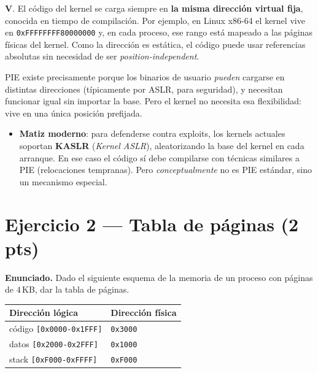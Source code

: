 \documentclass[11pt,a4paper]{article}
\begin{document}
\begin{respuesta}
\textbf{V}. El código del kernel se carga siempre en \textbf{la misma
dirección virtual fija}, conocida en tiempo de compilación. Por
ejemplo, en Linux x86-64 el kernel vive en
\texttt{0xFFFFFFFF80000000} y, en cada proceso, ese rango está
mapeado a las páginas físicas del kernel. Como la dirección es
estática, el código puede usar referencias absolutas sin necesidad
de ser \emph{position-independent}.

PIE existe precisamente porque los binarios de usuario \emph{pueden}
cargarse en distintas direcciones (típicamente por ASLR, para
seguridad), y necesitan funcionar igual sin importar la base. Pero
el kernel no necesita esa flexibilidad: vive en una única posición
prefijada.

\begin{itemize}[leftmargin=*,nosep]
    \item \textbf{Matiz moderno}: para defenderse contra exploits,
        los kernels actuales soportan \textbf{KASLR} (\emph{Kernel
        ASLR}), aleatorizando la base del kernel en cada arranque.
        En ese caso el código sí debe compilarse con técnicas
        similares a PIE (relocaciones tempranas). Pero
        \emph{conceptualmente} no es PIE estándar, sino un
        mecanismo especial.
\end{itemize}
\end{respuesta}

\section{Ejercicio 2 --- Tabla de páginas (2 pts)}

\textbf{Enunciado.} Dado el siguiente esquema de la memoria de un
proceso con páginas de $4$\,KB, dar la tabla de páginas.

\begin{center}
\small
\begin{tabular}{@{}ll@{}}
\toprule
Dirección lógica          & Dirección física \\
\midrule
código \texttt{[0x0000-0x1FFF]}  & \texttt{0x3000} \\
datos  \texttt{[0x2000-0x2FFF]}  & \texttt{0x1000} \\
stack  \texttt{[0xF000-0xFFFF]}  & \texttt{0xF000} \\
\bottomrule
\end{tabular}
\end{center}
\end{document}

